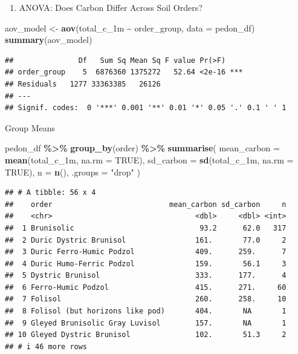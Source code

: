 \documentclass[
]{article}
\newenvironment{Shaded}{\begin{snugshade}}{\end{snugshade}}
\newcommand{\AttributeTok}[1]{\textcolor[rgb]{0.13,0.29,0.53}{#1}}
\newcommand{\ConstantTok}[1]{\textcolor[rgb]{0.56,0.35,0.01}{#1}}
\newcommand{\FunctionTok}[1]{\textcolor[rgb]{0.13,0.29,0.53}{\textbf{#1}}}
\newcommand{\NormalTok}[1]{#1}
\newcommand{\OtherTok}[1]{\textcolor[rgb]{0.56,0.35,0.01}{#1}}
\newcommand{\SpecialCharTok}[1]{\textcolor[rgb]{0.81,0.36,0.00}{\textbf{#1}}}
\newcommand{\StringTok}[1]{\textcolor[rgb]{0.31,0.60,0.02}{#1}}
\providecommand{\tightlist}{%
  \setlength{\itemsep}{0pt}\setlength{\parskip}{0pt}}
\begin{document}
\begin{enumerate}
\def\labelenumi{\arabic{enumi}.}
\setcounter{enumi}{3}
\tightlist
\item
  ANOVA: Does Carbon Differ Across Soil Orders?
\end{enumerate}

\begin{Shaded}
\begin{Highlighting}[]
\NormalTok{aov\_model }\OtherTok{\textless{}{-}} \FunctionTok{aov}\NormalTok{(total\_c\_1m }\SpecialCharTok{\textasciitilde{}}\NormalTok{ order\_group, }\AttributeTok{data =}\NormalTok{ pedon\_df)}
\FunctionTok{summary}\NormalTok{(aov\_model)}
\end{Highlighting}
\end{Shaded}

\begin{verbatim}
##               Df   Sum Sq Mean Sq F value Pr(>F)    
## order_group    5  6876360 1375272   52.64 <2e-16 ***
## Residuals   1277 33363385   26126                   
## ---
## Signif. codes:  0 '***' 0.001 '**' 0.01 '*' 0.05 '.' 0.1 ' ' 1
\end{verbatim}

Group Means

\begin{Shaded}
\begin{Highlighting}[]
\NormalTok{pedon\_df }\SpecialCharTok{\%\textgreater{}\%}
  \FunctionTok{group\_by}\NormalTok{(order) }\SpecialCharTok{\%\textgreater{}\%}
  \FunctionTok{summarise}\NormalTok{(}
    \AttributeTok{mean\_carbon =} \FunctionTok{mean}\NormalTok{(total\_c\_1m, }\AttributeTok{na.rm =} \ConstantTok{TRUE}\NormalTok{),}
    \AttributeTok{sd\_carbon =} \FunctionTok{sd}\NormalTok{(total\_c\_1m, }\AttributeTok{na.rm =} \ConstantTok{TRUE}\NormalTok{),}
    \AttributeTok{n =} \FunctionTok{n}\NormalTok{(),}
    \AttributeTok{.groups =} \StringTok{"drop"}
\NormalTok{  )}
\end{Highlighting}
\end{Shaded}

\begin{verbatim}
## # A tibble: 56 x 4
##    order                           mean_carbon sd_carbon     n
##    <chr>                                 <dbl>     <dbl> <int>
##  1 Brunisolic                             93.2      62.0   317
##  2 Duric Dystric Brunisol                161.       77.0     2
##  3 Duric Ferro-Humic Podzol              409.      259.      7
##  4 Duric Humo-Ferric Podzol              159.       56.1     3
##  5 Dystric Brunisol                      333.      177.      4
##  6 Ferro-Humic Podzol                    415.      271.     60
##  7 Folisol                               260.      258.     10
##  8 Folisol (but horizons like pod)       404.       NA       1
##  9 Gleyed Brunisolic Gray Luvisol        157.       NA       1
## 10 Gleyed Dystric Brunisol               102.       51.3     2
## # i 46 more rows
\end{verbatim}
\end{document}
